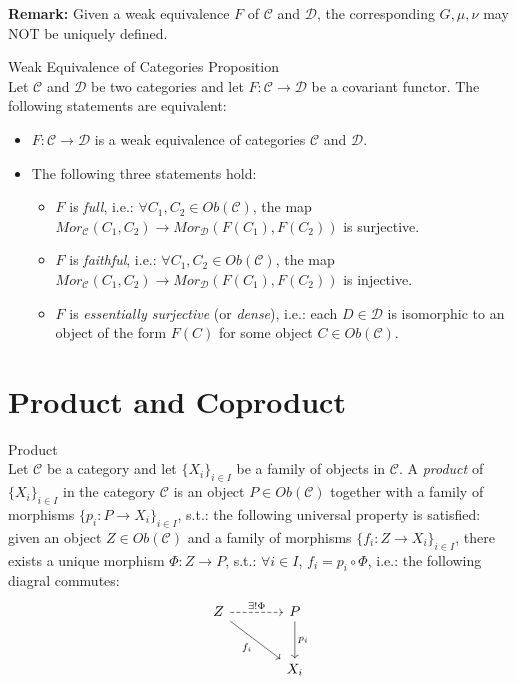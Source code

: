 \noindent\textbf{Remark:} Given a weak equivalence $F$ of $\mathcal{C}$ and $\mathcal{D}$, the corresponding $G,\mu,\nu$ may NOT be uniquely defined.

\begin{proposition}{Weak Equivalence of Categories Proposition}\\
Let $\mathcal{C}$ and $\mathcal{D}$ be two categories and let $F: \mathcal{C} \to \mathcal{D}$ be a covariant functor. The following statements are equivalent:
\begin{itemize}
    \item $F: \mathcal{C} \to \mathcal{D}$ is a weak equivalence of categories $\mathcal{C}$ and $\mathcal{D}$.
    \item The following three statements hold:
    \begin{itemize}
        \item $F$ is \textit{full}, i.e.: $\forall C_1,C_2 \in Ob(\mathcal{C})$, the map $Mor_\mathcal{C} (C_1,C_2) \to Mor_\mathcal{D} (F(C_1) ,F(C_2))$ is surjective.
        \item $F$ is \textit{faithful}, i.e.: $\forall C_1,C_2 \in Ob(\mathcal{C})$, the map $Mor_\mathcal{C} (C_1,C_2) \to Mor_\mathcal{D} (F(C_1) ,F(C_2))$ is injective.
        \item $F$ is \textit{essentially surjective} (or \textit{dense}), i.e.: each $D \in \mathcal{
        D
        }$ is isomorphic to an object of the form $F(C)$ for some object $C \in Ob(\mathcal{C})$.
    \end{itemize}
\end{itemize}
\end{proposition}

\section{Product and Coproduct}

\begin{definition}{Product}\\
Let $\mathcal{C}$ be a category and let $\{ X_i \}_{i \in I}$ be a family of objects in $\mathcal{C}$. A \textit{product} of $\{ X_i \}_{i \in I}$ in the category $\mathcal{C}$ is an object $P \in Ob(\mathcal{C})$ together with a family of morphisms $\{ p_i: P \to X_i \}_{i \in I}$, s.t.: the following universal property is satisfied:
\noindent given an object $Z \in Ob(\mathcal{C})$ and a family of morphisms $\{ f_i: Z \to X_i\}_{i \in I}$, there exists a unique morphism $\Phi: Z \to P$, s.t.: $\forall i \in I$, $f_i = p_i \circ \Phi$, i.e.: the following diagral commutes:
$$\begin{tikzcd}[row sep=large, column sep=large]
    Z \arrow[r, dashed, "\exists! \Phi"] \arrow[dr, "f_i"'] & P \arrow[d, "p_i"] \\
    & X_i
\end{tikzcd}$$
\end{definition}

